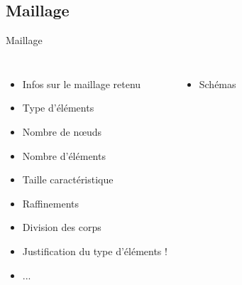 \subsection{Maillage}
\label{sec:Maillage}

\begin{frame}[c]{Maillage}
  \begin{columns}
    \begin{itemize}
        \item Infos sur le maillage retenu
        \item Type d'éléments
        \item Nombre de nœuds
        \item Nombre d'éléments
        \item Taille caractéristique
        \item Raffinements
        \item Division des corps
        \item Justification du type d'éléments !
        \item ...
    \end{itemize}
    \begin{itemize}
        \item Schémas
    \end{itemize}
  \end{columns}
\end{frame}

		
